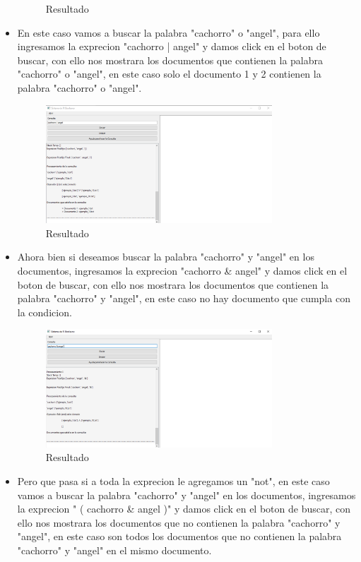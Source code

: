 \begin{itemize}
\begin{figure}[ht]
    \caption{Resultado}
  \end{figure}
  \item En este caso vamos a buscar la palabra "cachorro" o "angel", para ello ingresamos la exprecion "cachorro | angel" y damos click en el boton de buscar, con ello nos mostrara los documentos que contienen la palabra "cachorro" o "angel", en este caso solo el documento 1 y 2 contienen la palabra "cachorro" o "angel".
  \begin{figure}[ht]
    \centering
    \includegraphics[width=0.8\textwidth]{src/img/resultado/4.png}
    \caption{Resultado}
  \end{figure}
  \newpage
  \item Ahora bien si deseamos buscar la palabra "cachorro" y "angel" en los documentos, ingresamos la exprecion "cachorro \& angel" y damos click en el boton de buscar, con ello nos mostrara los documentos que contienen la palabra "cachorro" y "angel", en este caso no hay documento que cumpla con la condicion.
  \begin{figure}[ht]
    \centering
    \includegraphics[width=0.8\textwidth]{src/img/resultado/5.png}
    \caption{Resultado}
  \end{figure}
  \item Pero que pasa si a toda la exprecion le agregamos un "not", en este caso vamos a buscar la palabra "cachorro" y "angel" en los documentos, ingresamos la exprecion "\! ( cachorro \& angel )" y damos click en el boton de buscar, con ello nos mostrara los documentos que no contienen la palabra "cachorro" y "angel", en este caso son todos los documentos que no contienen la palabra "cachorro" y "angel" en el mismo documento.\\

\end{itemize}
